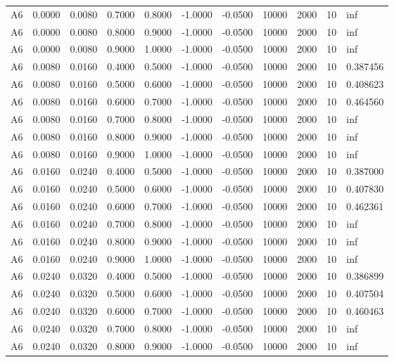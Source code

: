 \documentclass{article}
\begin{document}
\begin{longtable}{l r r r r r r r r r l}
A6 & 0.0000 & 0.0080 & 0.7000 & 0.8000 & -1.0000 & -0.0500 & 10000 & 2000 & 10 & inf \\
A6 & 0.0000 & 0.0080 & 0.8000 & 0.9000 & -1.0000 & -0.0500 & 10000 & 2000 & 10 & inf \\
A6 & 0.0000 & 0.0080 & 0.9000 & 1.0000 & -1.0000 & -0.0500 & 10000 & 2000 & 10 & inf \\
A6 & 0.0080 & 0.0160 & 0.4000 & 0.5000 & -1.0000 & -0.0500 & 10000 & 2000 & 10 & 0.387456 \\
A6 & 0.0080 & 0.0160 & 0.5000 & 0.6000 & -1.0000 & -0.0500 & 10000 & 2000 & 10 & 0.408623 \\
A6 & 0.0080 & 0.0160 & 0.6000 & 0.7000 & -1.0000 & -0.0500 & 10000 & 2000 & 10 & 0.464560 \\
A6 & 0.0080 & 0.0160 & 0.7000 & 0.8000 & -1.0000 & -0.0500 & 10000 & 2000 & 10 & inf \\
A6 & 0.0080 & 0.0160 & 0.8000 & 0.9000 & -1.0000 & -0.0500 & 10000 & 2000 & 10 & inf \\
A6 & 0.0080 & 0.0160 & 0.9000 & 1.0000 & -1.0000 & -0.0500 & 10000 & 2000 & 10 & inf \\
A6 & 0.0160 & 0.0240 & 0.4000 & 0.5000 & -1.0000 & -0.0500 & 10000 & 2000 & 10 & 0.387000 \\
A6 & 0.0160 & 0.0240 & 0.5000 & 0.6000 & -1.0000 & -0.0500 & 10000 & 2000 & 10 & 0.407830 \\
A6 & 0.0160 & 0.0240 & 0.6000 & 0.7000 & -1.0000 & -0.0500 & 10000 & 2000 & 10 & 0.462361 \\
A6 & 0.0160 & 0.0240 & 0.7000 & 0.8000 & -1.0000 & -0.0500 & 10000 & 2000 & 10 & inf \\
A6 & 0.0160 & 0.0240 & 0.8000 & 0.9000 & -1.0000 & -0.0500 & 10000 & 2000 & 10 & inf \\
A6 & 0.0160 & 0.0240 & 0.9000 & 1.0000 & -1.0000 & -0.0500 & 10000 & 2000 & 10 & inf \\
A6 & 0.0240 & 0.0320 & 0.4000 & 0.5000 & -1.0000 & -0.0500 & 10000 & 2000 & 10 & 0.386899 \\
A6 & 0.0240 & 0.0320 & 0.5000 & 0.6000 & -1.0000 & -0.0500 & 10000 & 2000 & 10 & 0.407504 \\
A6 & 0.0240 & 0.0320 & 0.6000 & 0.7000 & -1.0000 & -0.0500 & 10000 & 2000 & 10 & 0.460463 \\
A6 & 0.0240 & 0.0320 & 0.7000 & 0.8000 & -1.0000 & -0.0500 & 10000 & 2000 & 10 & inf \\
A6 & 0.0240 & 0.0320 & 0.8000 & 0.9000 & -1.0000 & -0.0500 & 10000 & 2000 & 10 & inf \\

\end{longtable}
\end{document}
